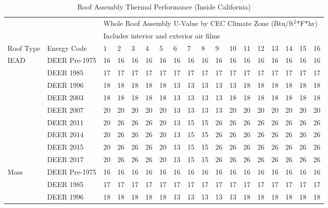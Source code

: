 \begin{table}
\scriptsize
\caption[Roof Assembly Thermal Performance (Inside California)]{Roof Assembly Thermal Performance (Inside California)}
\label{tab:roof_r_values_deer}
\centering
\begin{tabular}{p{0.4in}p{0.7in}p{0.1in}p{0.1in}p{0.1in}p{0.1in}p{0.1in}p{0.1in}p{0.1in}p{0.1in}p{0.1in}p{0.1in}p{0.1in}p{0.1in}p{0.1in}p{0.1in}p{0.1in}p{0.1in}}
\hline
         &               & \multicolumn{16}{l}{Whole Roof Assembly U-Value by CEC Climate Zone (Btu/ft$^2$*F*hr)}  \\
         &               & \multicolumn{16}{l}{Includes interior and exterior air films}  \\ \hline
Roof Type  & Energy Code   & 1  & 2  & 3  & 4  & 5  & 6  & 7  & 8  & 9  & 10 & 11 & 12 & 13 & 14 & 15 & 16 \\ \hline
IEAD       & DEER Pre-1975 & 16 & 16 & 16 & 16 & 16 & 16 & 16 & 16 & 16 & 16 & 16 & 16 & 16 & 16 & 16 & 16 \\
         & DEER 1985     & 17 & 17 & 17 & 17 & 17 & 17 & 17 & 17 & 17 & 17 & 17 & 17 & 17 & 17 & 17 & 17 \\
         & DEER 1996     & 18 & 18 & 18 & 18 & 18 & 13 & 13 & 13 & 13 & 13 & 18 & 18 & 18 & 18 & 18 & 18 \\
         & DEER 2003     & 18 & 18 & 18 & 18 & 18 & 13 & 13 & 13 & 13 & 18 & 18 & 18 & 18 & 18 & 18 & 18 \\
         & DEER 2007     & 20 & 20 & 20 & 20 & 20 & 13 & 13 & 13 & 13 & 20 & 20 & 20 & 20 & 20 & 20 & 20 \\
         & DEER 2011     & 20 & 26 & 26 & 26 & 20 & 13 & 15 & 15 & 26 & 26 & 26 & 26 & 26 & 26 & 26 & 26 \\
         & DEER 2014     & 20 & 26 & 26 & 26 & 20 & 13 & 15 & 15 & 26 & 26 & 26 & 26 & 26 & 26 & 26 & 26 \\
         & DEER 2015     & 20 & 26 & 26 & 26 & 20 & 13 & 15 & 15 & 26 & 26 & 26 & 26 & 26 & 26 & 26 & 26 \\
         & DEER 2017     & 20 & 26 & 26 & 26 & 20 & 13 & 15 & 15 & 26 & 26 & 26 & 26 & 26 & 26 & 26 & 26 \\
Mass       & DEER Pre-1975 & 16 & 16 & 16 & 16 & 16 & 16 & 16 & 16 & 16 & 16 & 16 & 16 & 16 & 16 & 16 & 16 \\
         & DEER 1985     & 17 & 17 & 17 & 17 & 17 & 17 & 17 & 17 & 17 & 17 & 17 & 17 & 17 & 17 & 17 & 17 \\
         & DEER 1996     & 18 & 18 & 18 & 18 & 18 & 13 & 13 & 13 & 13 & 13 & 18 & 18 & 18 & 18 & 18 & 18 \\

\end{tabular}
\end{table}
